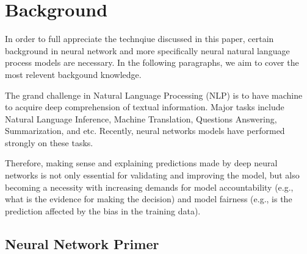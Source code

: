 \section{Background}
\label{sec:languageInference}

In order to full appreciate the technqiue discussed in this paper, certain background
in neural network and more specifically neural natural language process models are necessary.
In the following paragraphs, we aim to cover the most relevent backgound knowledge.


The grand challenge in Natural Language Processing (NLP) is to have machine to acquire
deep comprehension of textual information. Major tasks include Natural Language Inference,
Machine Translation, Questions Answering, Summarization, and etc.
Recently, neural networks models have performed strongly on these tasks.

Therefore, making sense and explaining predictions made by deep neural networks is not only
essential for validating and improving the model, but also becoming a necessity with
increasing demands for model accountability (e.g., what is the evidence for making the decision)
and model fairness (e.g., is the prediction affected by the bias in the training data).


\subsection{Neural Network Primer}


